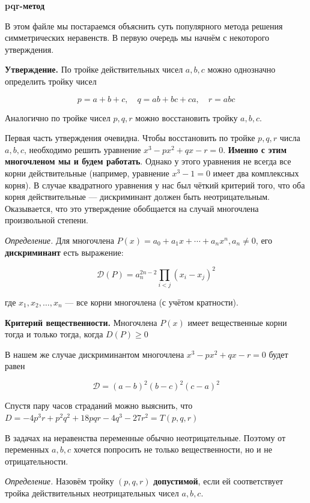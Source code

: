 \centerline{\bf \Huge pqr-метод}

В этом файле мы постараемся объяснить суть популярного метода решения симметрических неравенств. В первую очередь мы начнём с некоторого утверждения.

\textbf{Утверждение.} 
По тройке действительных чисел $a, b, c$ можно однозначно определить тройку чисел

$$
p=a+b+c, \quad q=a b+b c+c a, \quad r=a b c
$$

Аналогично по тройке чисел $p,q,r$ можно восстановить тройку $a,b,c$. 

Первая часть утверждения очевидна. Чтобы восстановить по тройке $p, q, r$ числа $a, b, c$, необходимо решить уравнение $x^3-p x^2+q x-r=0$. \textbf{Именно с этим многочленом мы и будем работать}. Однако у этого уравнения не всегда все корни действительные (например, уравнение $x^3 -1=0$ имеет два комплексных корня). В случае квадратного уравнения у нас был чёткий критерий того, что оба корня действительные --- дискриминант должен быть неотрицательным. Оказывается, что это утверждение обобщается на случай многочлена произвольной степени.

\textit{Определение.}
Для многочлена $P(x)=a_0+a_1 x+\cdots+a_n x^n, a_n \neq 0$, его \textbf{дискриминант} есть выражение:

$$
\mathcal{D}(P)=a_n^{2 n-2} \prod_{i < j}\left(x_i-x_j\right)^2
$$

где $x_1, x_2, \ldots, x_n$ --- все корни многочлена (с учётом кратности).

\textbf{Критерий вещественности.}
Многочлена $P(x)$ имеет вещественные корни тогда и только тогда, когда $D(P)\geq 0$

В нашем же случае дискриминантом многочлена $x^3-p x^2+q x-r=0$ будет равен

$$
\mathcal{D} = (a-b)^2(b-c)^2(c-a)^2
$$

Спустя пару часов страданий можно выяснить, что $D =-4 p^3 r+p^2 q^2+18 p q r-4 q^3-27 r^2=T(p, q, r)$

\newpage

\hspace{3mm}

В задачах на неравенства переменные обычно неотрицательные. Поэтому от переменных $a,b,c$ хочется попросить не только вещественности, но и не отрицательности. 

\textit{Определение.}
Назовём тройку $(p, q, r)$ \textbf{допустимой}, если ей соответствует тройка действительных неотрицательных чисел $a, b, c$.

